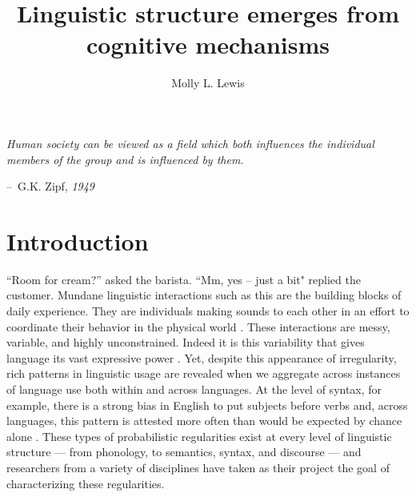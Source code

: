 \documentclass[man, noapacite, 12pt]{apa2}
\title{Linguistic structure emerges from cognitive mechanisms}
\author{Molly L. Lewis}
\affiliation{Department of Psychology, Stanford University\\ Conceptual Analysis of Dissertation Area\\ 6 October 2014}
\makeatletter
\newenvironment{chapquote}[2][2em]
  {\setlength{\@tempdima}{#1}%
   \def\chapquote@author{#2}%
   \parshape 1 \@tempdima \dimexpr\textwidth-2\@tempdima\relax%
   \itshape}
  {\par\normalfont\hfill--\ \chapquote@author\hspace*{\@tempdima}\par\bigskip}
\makeatother
\begin{document}
\maketitle


\begin{chapquote}{G.K. Zipf, \textit{1949}}
\noindent  Human society can be viewed as a field which both influences the individual members of the group and is influenced by them. 
\end{chapquote}

\section{Introduction}
``Room for cream?'' asked the barista. ``Mm, yes -- just a bit" replied the customer. Mundane linguistic interactions such as this are the building blocks of daily experience. They are individuals making sounds to each other in an effort to coordinate their behavior in the physical world \cite{clark2006social}. These interactions are messy, variable, and highly unconstrained. Indeed it is this variability that gives language its vast expressive power \cite{hockett1960}. Yet, despite this appearance of irregularity, rich patterns in linguistic usage are revealed when we aggregate across instances of language use both within and across languages. At the level of syntax, for example, there is a strong bias in English to put subjects before verbs and, across languages, this pattern is attested more often than would be expected by chance alone  \cite{dryer2005order}. These types of probabilistic regularities exist at every level of linguistic structure --- from phonology, to semantics, syntax, and discourse --- and researchers from a variety of disciplines have taken as their project the goal of characterizing these regularities.
\end{document}
